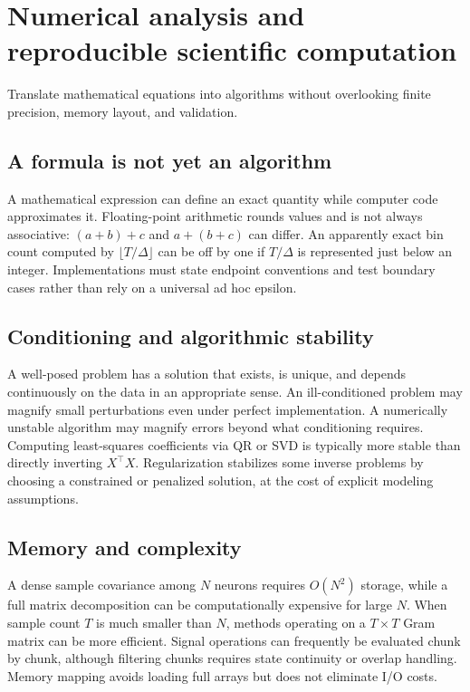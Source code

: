 \chapter{Numerical analysis and reproducible scientific computation}\label{ch:numerical}
\begin{readergoal}Translate mathematical equations into algorithms without overlooking finite precision, memory layout, and validation.\end{readergoal}
\section{A formula is not yet an algorithm}
A mathematical expression can define an exact quantity while computer code approximates it. Floating-point arithmetic rounds values and is not always associative: $(a+b)+c$ and $a+(b+c)$ can differ. An apparently exact bin count computed by $\lfloor T/\Delta\rfloor$ can be off by one if $T/\Delta$ is represented just below an integer. Implementations must state endpoint conventions and test boundary cases rather than rely on a universal ad hoc epsilon.

\section{Conditioning and algorithmic stability}
A well-posed problem has a solution that exists, is unique, and depends continuously on the data in an appropriate sense. An ill-conditioned problem may magnify small perturbations even under perfect implementation. A numerically unstable algorithm may magnify errors beyond what conditioning requires. Computing least-squares coefficients via QR or SVD is typically more stable than directly inverting $X^\top X$. Regularization stabilizes some inverse problems by choosing a constrained or penalized solution, at the cost of explicit modeling assumptions.

\section{Memory and complexity}
A dense sample covariance among $N$ neurons requires $O(N^2)$ storage, while a full matrix decomposition can be computationally expensive for large $N$. When sample count $T$ is much smaller than $N$, methods operating on a $T\times T$ Gram matrix can be more efficient. Signal operations can frequently be evaluated chunk by chunk, although filtering chunks requires state continuity or overlap handling. Memory mapping avoids loading full arrays but does not eliminate I/O costs.

